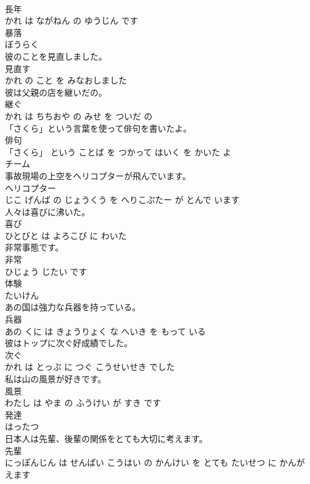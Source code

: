 \documentclass[8pt]{extreport}
\begin{document}
\begin{CJK}{UTF8}{min}
\\	長年 
\\	かれ は ながねん の ゆうじん です			
\\	暴落	
\\	ぼうらく			
\\	彼のことを見直しました。	
\\	見直す 
\\	かれ の こと を みなおしました			
\\	彼は父親の店を継いだの。	
\\	継ぐ 
\\	かれ は ちちおや の みせ を ついだ の			
\\	「さくら」という言葉を使って俳句を書いたよ。	
\\	俳句 
\\	「さくら」 という ことば を つかって はいく を かいた よ			
\\	チーム	
\\	事故現場の上空をヘリコプターが飛んでいます。	
\\	ヘリコプター 
\\	じこ げんば の じょうくう を へりこぷたー が とんで います			
\\	人々は喜びに沸いた。	
\\	喜び 
\\	ひとびと は よろこび に わいた			
\\	非常事態です。	
\\	非常 
\\	ひじょう じたい です			
\\	体験	
\\	たいけん			
\\	あの国は強力な兵器を持っている。	
\\	兵器 
\\	あの くに は きょうりょく な へいき を もって いる			
\\	彼はトップに次ぐ好成績でした。	
\\	次ぐ 
\\	かれ は とっぷ に つぐ こうせいせき でした			
\\	私は山の風景が好きです。	
\\	風景 
\\	わたし は やま の ふうけい が すき です			
\\	発達	
\\	はったつ			
\\	日本人は先輩、後輩の関係をとても大切に考えます。	
\\	先輩 
\\	にっぽんじん は せんぱい こうはい の かんけい を とても たいせつ に かんがえます			

\end{CJK}
\end{document}
